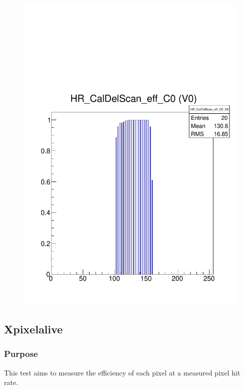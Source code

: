 \documentclass[a4paper,12pt,twoside]{article}
\begin{document}
\begin{figure} [h!]
\begin{minipage}{.48\textwidth}
  \includegraphics[width=\textwidth]{./Figures/CalDel_Efficiency.pdf}
  \label{CalDel-Efficiency}
\end{minipage}
\end{figure}

\clearpage 
\subsection{Xpixelalive}

\subsubsection{Purpose}

This test aims to measure the efficiency of each pixel at a measured pixel hit rate.
\end{document}
